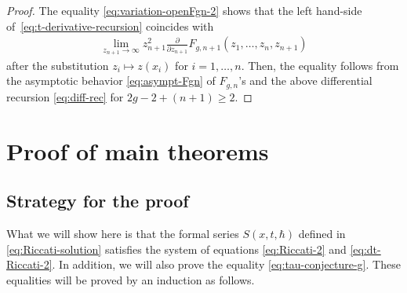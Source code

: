 \documentclass[11pt]{article}
\theoremstyle{definition}
\numberwithin{equation}{section}
\def\p{\partial}
\begin{document}
\begin{proof}
The equality \eqref{eq:variation-openFgn-2} shows that
the left hand-side of~\eqref{eq:t-derivative-recursion}
coincides with
\begin{gather*}
\lim_{z_{n+1} \rightarrow \infty} z_{n+1}^{2}
\frac{\p}{\p z_{n+1}} F_{g,n+1}(z_{1},\dots,z_{n},z_{n+1})
\end{gather*}
after the substitution $z_{i} \mapsto z(x_{i})$ for $i=1,\dots,n$.
Then, the equality follows from
the asymptotic behavior \eqref{eq:asympt-Fgn} of $F_{g,n}$'s
and the above dif\/ferential recursion \eqref{eq:diff-rec}
for $2g-2+ (n+1) \ge 2$.
\end{proof}


\section{Proof of main theorems}
\label{section:proof}

\subsection{Strategy for the proof}

What we will show here is that the formal series $S(x,t,\hbar)$
def\/ined in \eqref{eq:Riccati-solution} satisf\/ies
the system of equations \eqref{eq:Riccati-2} and
\eqref{eq:dt-Riccati-2}. In addition, we will also prove
the equality \eqref{eq:tau-conjecture-g}.
These equalities will be proved by an induction as follows.
\end{document}
